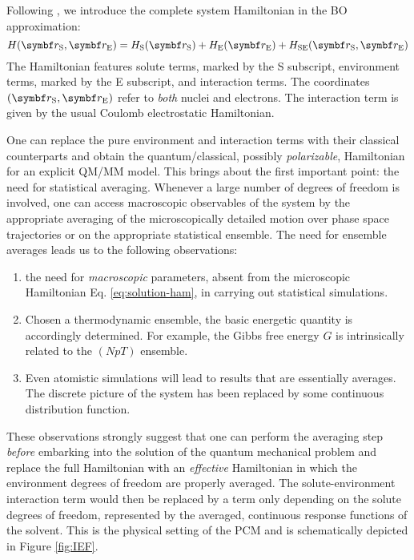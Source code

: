 Following \citeauthor{Tomasi2007-es}, we introduce the complete system
Hamiltonian in the \acrshort{BO} approximation:\autocite{Tomasi2004-dc,
Tomasi2007-es}
\begin{equation}\label{eq:solution-ham}
 H(\vect{r}_\mathrm{S}, \vect{r}_\mathrm{E}) =
  H_\mathrm{S}(\vect{r}_\mathrm{S}) +  H_\mathrm{E}(\vect{r}_\mathrm{E})
+ H_\mathrm{SE}(\vect{r}_\mathrm{S}, \vect{r}_\mathrm{E})
\end{equation}
The Hamiltonian features solute terms, marked by the S subscript,
environment terms, marked by the E subscript, and interaction terms.
The coordinates $(\vect{r}_\mathrm{S}, \vect{r}_\mathrm{E})$ refer to
\emph{both} nuclei and electrons.
The interaction term is given by the usual Coulomb electrostatic
Hamiltonian.

One can replace the pure environment and interaction terms with their
classical counterparts and obtain the quantum/classical, possibly
\emph{polarizable}, Hamiltonian for an explicit \acrshort{QM}/\acrshort{MM} model.
This brings about the first important point: the need for statistical
averaging.
Whenever a large number of degrees of freedom is involved, one can
access macroscopic observables of the system by the appropriate
averaging of the microscopically detailed motion over phase space
trajectories or on the appropriate statistical
ensemble.\autocite{Hill1960-ql}
The need for ensemble averages leads us to the following observations:
\begin{enumerate}
 \item
   the need for \emph{macroscopic} parameters, absent from the
   microscopic Hamiltonian Eq. \eqref{eq:solution-ham}, in carrying out
   statistical simulations.
 \item
   Chosen a thermodynamic ensemble, the basic energetic quantity is
   accordingly determined. For example, the Gibbs free energy  $G$ is
   intrinsically related to the $(NpT)$ ensemble.
 \item
   Even atomistic simulations will lead to results that are essentially
   averages. The discrete picture of the system has been replaced by
   some continuous distribution function.
\end{enumerate}

These observations strongly suggest that one can perform the averaging
step \emph{before} embarking into the solution of the quantum mechanical
problem and replace the full Hamiltonian with an \emph{effective}
Hamiltonian in which the environment degrees of freedom are properly
averaged.\autocite{Angyan1992-vo, Tapia1992-pu}
The solute-environment interaction term would then be replaced by
a term only depending on the solute degrees of freedom, represented by
the averaged, continuous response functions of the solvent.
This is the physical setting of the \gls{PCM} and is schematically
depicted in Figure \ref{fig:IEF}.

